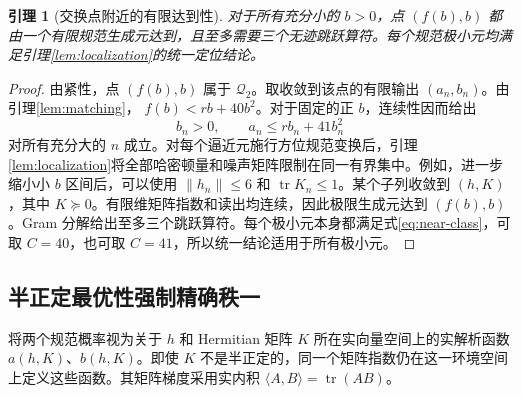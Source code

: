 \documentclass[UTF8,11pt,a4paper,fontset=fandol]{ctexart}
\newtheorem{lemma}[theorem]{引理}
\theoremstyle{definition}
\theoremstyle{remark}
\DeclareMathOperator{\tr}{tr}
\newcommand{\Q}{\mathcal Q_2}
\newcommand{\PSD}{\succeq0}
\begin{document}
\begin{lemma}[交换点附近的有限达到性]\label{lem:attainment}
对于所有充分小的 \(b>0\)，点 \((f(b),b)\) 都由一个有限规范生成元达到，且至多需要三个无迹跳跃算符。每个规范极小元均满足引理\ref{lem:localization}的统一定位结论。
\end{lemma}
\begin{proof}
由紧性，点 \((f(b),b)\) 属于 \(\Q\)。取收敛到该点的有限输出 \((a_n,b_n)\)。由引理\ref{lem:matching}，
\(f(b)<rb+40b^2\)。对于固定的正 \(b\)，连续性因而给出
\[
 b_n>0,\qquad a_n\leq rb_n+41b_n^2
\]
对所有充分大的 \(n\) 成立。对每个逼近元施行方位规范变换后，引理\ref{lem:localization}将全部哈密顿量和噪声矩阵限制在同一有界集中。例如，进一步缩小小 \(b\) 区间后，可以使用 \(\|h_n\|\leq6\) 和 \(\tr K_n\leq1\)。某个子列收敛到 \((h,K)\)，其中 \(K\PSD\)。有限维矩阵指数和读出均连续，因此极限生成元达到 \((f(b),b)\)。Gram 分解给出至多三个跳跃算符。每个极小元本身都满足式\eqref{eq:near-class}，可取 \(C=40\)，也可取 \(C=41\)，所以统一结论适用于所有极小元。
\end{proof}

\subsection{半正定最优性强制精确秩一}
将两个规范概率视为关于 \(h\) 和 Hermitian 矩阵 \(K\) 所在实向量空间上的实解析函数 \(a(h,K)\)、\(b(h,K)\)。即使 \(K\) 不是半正定的，同一个矩阵指数仍在这一环境空间上定义这些函数。其矩阵梯度采用实内积 \(\langle A,B\rangle=\tr(AB)\)。
\end{document}
